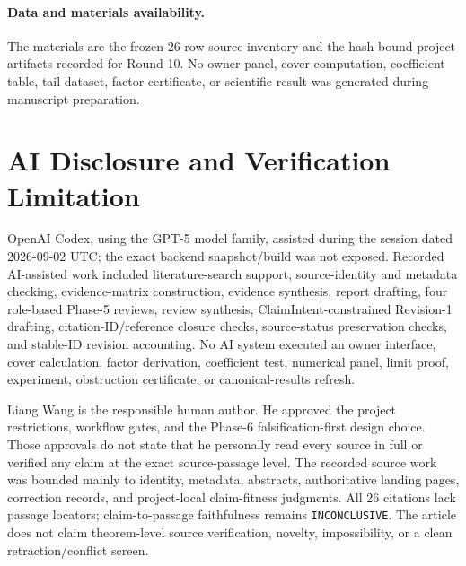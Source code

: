 \documentclass[11pt]{article}
\begin{document}
\paragraph{Data and materials availability.} The materials are the
frozen 26-row source inventory and the hash-bound project artifacts
recorded for Round 10. No owner panel, cover computation, coefficient
table, tail dataset, factor certificate, or scientific result was
generated during manuscript preparation.

\hypertarget{ai-disclosure-and-verification-limitation}{%
\section*{AI Disclosure and Verification
Limitation}\label{ai-disclosure-and-verification-limitation}}

OpenAI Codex, using the GPT-5 model family, assisted during the session
dated 2026-09-02 UTC; the exact backend snapshot/build was not exposed.
Recorded AI-assisted work included literature-search support,
source-identity and metadata checking, evidence-matrix construction,
evidence synthesis, report drafting, four role-based Phase-5 reviews,
review synthesis, ClaimIntent-constrained Revision-1 drafting,
citation-ID/reference closure checks, source-status preservation checks,
and stable-ID revision accounting. No AI system executed an owner
interface, cover calculation, factor derivation, coefficient test,
numerical panel, limit proof, experiment, obstruction certificate, or
canonical-results refresh.

Liang Wang is the responsible human author. He approved the project
restrictions, workflow gates, and the Phase-6 falsification-first design
choice. Those approvals do not state that he personally read every
source in full or verified any claim at the exact source-passage level.
The recorded source work was bounded mainly to identity, metadata,
abstracts, authoritative landing pages, correction records, and
project-local claim-fitness judgments. All 26 citations lack passage
locators; claim-to-passage faithfulness remains \texttt{INCONCLUSIVE}.
The article does not claim theorem-level source verification, novelty,
impossibility, or a clean retraction/conflict screen.



\end{document}
